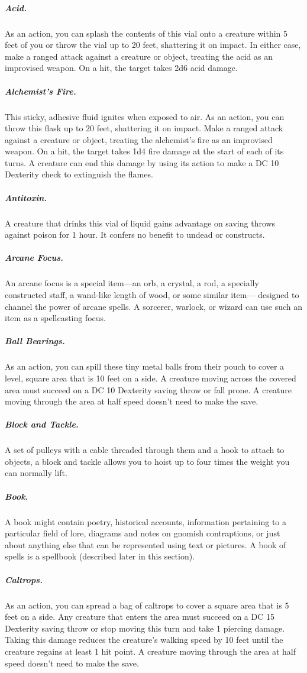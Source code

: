 \subparagraph*{Acid.} As an action, you can splash the contents of this vial onto a creature within 5 feet of you or throw the vial up to 20 feet, shattering it on impact. In either case, make a ranged attack against a creature or object, treating the acid as an improvised weapon. On a hit, the target takes 2d6 acid damage.

\subparagraph*{Alchemist's Fire.} This sticky, adhesive fluid ignites when exposed to air. As an action, you can throw this flask up to 20 feet, shattering it on impact. Make a ranged attack against a creature or object, treating the alchemist's fire as an improvised weapon. On a hit, the target takes 1d4 fire damage at the start of each of its turns. A creature can end this damage by using its action to make a DC 10 Dexterity check to extinguish the flames.

\subparagraph*{Antitoxin.} A creature that drinks this vial of liquid gains advantage on saving throws against poison for 1 hour. It confers no benefit to undead or constructs.

\subparagraph*{Arcane Focus.} An arcane focus is a special item—an orb, a crystal, a rod, a specially constructed staff, a wand-like length of wood, or some similar item— designed to channel the power of arcane spells. A sorcerer, warlock, or wizard can use such an item as a spellcasting focus.

\subparagraph*{Ball Bearings.} As an action, you can spill these tiny metal balls from their pouch to cover a level, square area that is 10 feet on a side. A creature moving across the covered area must succeed on a DC 10 Dexterity saving throw or fall prone. A creature moving through the area at half speed doesn't need to make the save.

\subparagraph*{Block and Tackle.} A set of pulleys with a cable threaded through them and a hook to attach to objects, a block and tackle allows you to hoist up to four times the weight you can normally lift.

\subparagraph*{Book.} A book might contain poetry, historical accounts, information pertaining to a particular field of lore, diagrams and notes on gnomish contraptions, or just about anything else that can be represented using text or pictures. A book of spells is a spellbook (described later in this section).

\subparagraph*{Caltrops.} As an action, you can spread a bag of caltrops to cover a square area that is 5 feet on a side. Any creature that enters the area must succeed on a DC 15 Dexterity saving throw or stop moving this turn and take 1 piercing damage. Taking this damage reduces the creature's walking speed by 10 feet until the creature regains at least 1 hit point. A creature moving through the area at half speed doesn't need to make the save.

